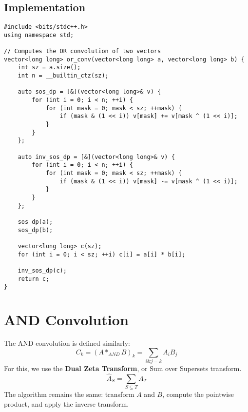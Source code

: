 \documentclass[10pt,a4paper]{article}
\begin{document}
\subsection{Implementation}
\begin{lstlisting}
#include <bits/stdc++.h>
using namespace std;

// Computes the OR convolution of two vectors
vector<long long> or_conv(vector<long long> a, vector<long long> b) {
    int sz = a.size();
    int n = __builtin_ctz(sz);

    auto sos_dp = [&](vector<long long>& v) {
        for (int i = 0; i < n; ++i) {
            for (int mask = 0; mask < sz; ++mask) {
                if (mask & (1 << i)) v[mask] += v[mask ^ (1 << i)];
            }
        }
    };

    auto inv_sos_dp = [&](vector<long long>& v) {
        for (int i = 0; i < n; ++i) {
            for (int mask = 0; mask < sz; ++mask) {
                if (mask & (1 << i)) v[mask] -= v[mask ^ (1 << i)];
            }
        }
    };

    sos_dp(a);
    sos_dp(b);

    vector<long long> c(sz);
    for (int i = 0; i < sz; ++i) c[i] = a[i] * b[i];

    inv_sos_dp(c);
    return c;
}
\end{lstlisting}

\section{AND Convolution}
The AND convolution is defined similarly:
$$ C_k = (A *_{AND} B)_k = \sum_{i \& j = k} A_i B_j $$
For this, we use the \textbf{Dual Zeta Transform}, or Sum over Supersets transform.
$$ \hat{A}_S = \sum_{S \subseteq T} A_T $$
The algorithm remains the same: transform $A$ and $B$, compute the pointwise product, and apply the inverse transform.
\end{document}
